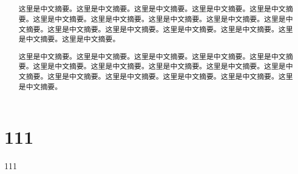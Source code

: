\documentclass[UTF-8, a4paper, 12pt]{ctexart}
\title{\bfseries \Huge  }
\author{}
\date{}
\begin{document}


\begin{abstract}
    这里是中文摘要。这里是中文摘要。这里是中文摘要。这里是中文摘要。这里是中文摘要。这里是中文摘要。这里是中文摘要。这里是中文摘要。这里是中文摘要。这里是中文摘要。这里是中文摘要。这里是中文摘要。这里是中文摘要。这里是中文摘要。这里是中文摘要。这里是中文摘要。
 
这里是中文摘要。这里是中文摘要。这里是中文摘要。这里是中文摘要。这里是中文摘要。这里是中文摘要。这里是中文摘要。这里是中文摘要。这里是中文摘要。这里是中文摘要。这里是中文摘要。这里是中文摘要。这里是中文摘要。这里是中文摘要。这里是中文摘要。

\end{abstract}

     

     
\thispagestyle{empty}       %
\newpage                    %
\tableofcontents\thispagestyle{empty}
\newpage
\setcounter{page}{1}        %



\section{111}

111
\end{document}

